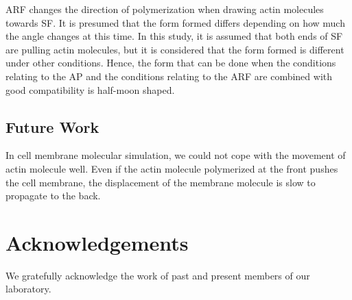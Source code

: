 \documentclass[a4paper,12pt]{book}
\begin{document}
ARF changes the direction of polymerization when drawing actin molecules towards SF. It is presumed that the form formed differs depending on how much the angle changes at this time. In this study, it is assumed that both ends of SF are pulling actin molecules, but it is considered that the form formed is different under other conditions. Hence, the form that can be done when the conditions relating to the AP and the conditions relating to the ARF are combined with good compatibility is half-moon shaped.
\section{Future Work}
In cell membrane molecular simulation, we could not cope with the movement of actin molecule well. Even if the actin molecule polymerized at the front pushes the cell membrane, the displacement of the membrane molecule is slow to propagate to the back.
\chapter*{Acknowledgements}
We gratefully acknowledge the work of past and present members of our laboratory.




\end{document}
